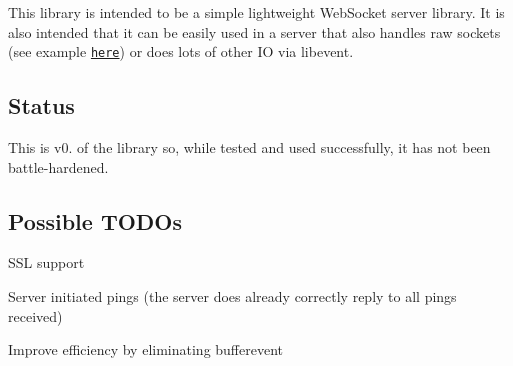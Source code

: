 This library is intended to be a simple lightweight Web\-Socket server library. It is also intended that it can be easily used in a server that also handles raw sockets (see example \href{https://github.com/crunchyfrog/libevws/blob/master/examples/dual_echo_server.c}{\tt here}) or does lots of other I\-O via libevent.

\subsection*{Status}

This is v0. of the library so, while tested and used successfully, it has not been battle-\/hardened.

\subsection*{Possible T\-O\-D\-Os}


\begin{DoxyItemize}
\item S\-S\-L support
\item Server initiated pings (the server does already correctly reply to all pings received)
\item Improve efficiency by eliminating bufferevent 
\end{DoxyItemize}